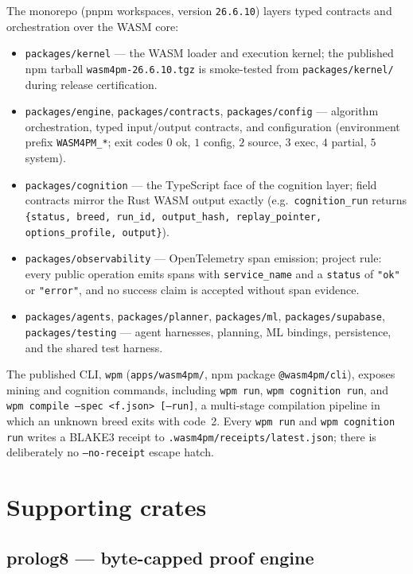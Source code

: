 \documentclass[11pt,oneside]{report}
\newcommand{\wpm}{\texttt{wpm}}
\begin{document}
The monorepo (pnpm workspaces, version \texttt{26.6.10}) layers
typed contracts and orchestration over the WASM core:

\begin{itemize}
  \item \texttt{packages/kernel} --- the WASM loader and execution kernel;
  the published npm tarball \texttt{wasm4pm-26.6.10.tgz} is smoke-tested
  from \texttt{packages/kernel/} during release certification.
  \item \texttt{packages/engine}, \texttt{packages/contracts},
  \texttt{packages/config} --- algorithm orchestration, typed input/output
  contracts, and configuration (environment prefix
  \texttt{WASM4PM\_*}; exit codes $0$ ok, $1$ config, $2$ source,
  $3$ exec, $4$ partial, $5$ system).
  \item \texttt{packages/cognition} --- the TypeScript face of the
  cognition layer; field contracts mirror the Rust WASM output exactly
  (e.g.\ \texttt{cognition\_run} returns
  \texttt{\{status, breed, run\_id, output\_hash, replay\_pointer,}
  \texttt{options\_profile, output\}}).
  \item \texttt{packages/observability} --- OpenTelemetry span emission;
  project rule: every public operation emits spans with
  \texttt{service\_name} and a \texttt{status} of \texttt{"ok"} or
  \texttt{"error"}, and no success claim is accepted without span
  evidence.
  \item \texttt{packages/agents}, \texttt{packages/planner},
  \texttt{packages/ml}, \texttt{packages/supabase},
  \texttt{packages/testing} --- agent harnesses, planning, ML bindings,
  persistence, and the shared test harness.
\end{itemize}

The published CLI, \wpm{} (\texttt{apps/wasm4pm/}, npm package
\texttt{@wasm4pm/cli}), exposes mining and cognition commands, including
\texttt{wpm run}, \texttt{wpm cognition run}, and
\texttt{wpm compile --spec <f.json> [--run]}, a multi-stage compilation
pipeline in which an unknown breed exits with code~2. Every
\texttt{wpm run} and \texttt{wpm cognition run} writes a BLAKE3 receipt to
\texttt{.wasm4pm/receipts/latest.json}; there is deliberately no
\texttt{--no-receipt} escape hatch.

\section{Supporting crates}

\subsection{prolog8 --- byte-capped proof engine}
\end{document}
